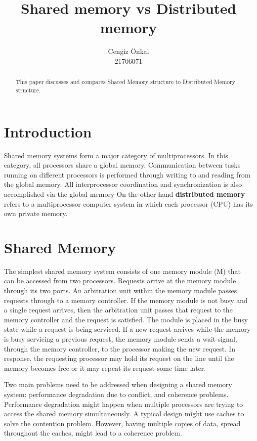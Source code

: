 \documentclass[11pt]{article}
\title{\textbf{Shared memory vs Distributed memory}}
\author{Cengiz Önkal\\21706071}
\date{}
\begin{document}
\maketitle

\begin{abstract}
This paper discusses and compares Shared Memory structure to Distributed Memory structure.
\end{abstract}




\section{Introduction}
Shared memory systems form a major category of multiprocessors. In this category,
all processors share a global memory. Communication between tasks running on
different processors is performed through writing to and reading from the global
memory. All interprocessor coordination and synchronization is also accomplished
via the global memory
On the other hand \textbf{distributed memory} refers to a multiprocessor computer system in which each processor (CPU) has its own private memory.

\section{Shared Memory}
The simplest shared memory system consists of one memory module (M) that can be
accessed from two processors. Requests arrive at the
memory module through its two ports. An arbitration unit within the memory
module passes requests through to a memory controller. If the memory module is
not busy and a single request arrives, then the arbitration unit passes that request
to the memory controller and the request is satisfied. The module is placed in the
busy state while a request is being serviced. If a new request arrives while the
memory is busy servicing a previous request, the memory module sends a wait
signal, through the memory controller, to the processor making the new request.
In response, the requesting processor may hold its request on the line until the
memory becomes free or it may repeat its request some time later.\cite{el2005advanced} 


Two main problems need to be addressed when designing a shared memory
system: performance degradation due to conflict, and coherence problems. Performance degradation might happen when multiple processors are trying to access the shared memory simultaneously. A typical design might use caches to solve the contention problem. However, having multiple copies of data, spread throughout the caches, might lead to a coherence problem. 
\end{document}
